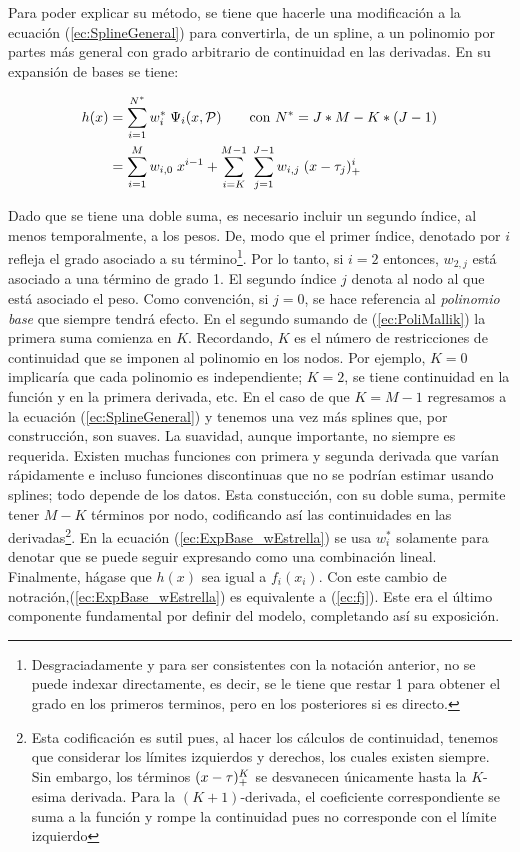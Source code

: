 \documentclass[../Main/Main.tex]{subfiles}
\begin{document}
Para poder explicar su método, se tiene que hacerle una modificación a la ecuación (\ref{ec:SplineGeneral}) para convertirla, de un spline, a un polinomio por partes más general con grado arbitrario de continuidad en las derivadas. En su expansión de bases se tiene:

\begin{align}
	h(x) &= \sum_{i = 1}^{N^*} w_i^* \; \Psi_i(x,\mathcal{P}) \qquad \text{con  } N^* = J*M - K*(J-1) \label{ec:ExpBase_wEstrella} \\ 
 		 &=	\sum_{i = 1}^M w_{i,0} \; x^{i-1} + 
			\sum_{i = K}^{M-1} \;
	 		\sum_{j = 1}^{J-1}w_{i,j}\;(x - \tau_j)_+^{i}
	 			\label{ec:PoliMallik}
\end{align}

Dado que se tiene una doble suma, es necesario incluir un segundo índice, al menos temporalmente, a los pesos. De, modo que el primer índice, denotado por $i$ refleja el grado asociado a su término\footnote{Desgraciadamente y para ser consistentes con la notación anterior, no se puede indexar directamente, es decir, se le tiene que restar 1 para obtener el grado en los primeros terminos, pero en los posteriores si es directo.}. Por lo tanto, si $i = 2$ entonces, $w_{2,j}$ está asociado a una término de grado 1. El segundo índice $j$ denota al nodo al que está asociado el peso. Como convención, si $j = 0$, se hace referencia al \textit{polinomio base} que siempre tendrá efecto. En el segundo sumando de (\ref{ec:PoliMallik}) la primera suma comienza en $K$. Recordando, $K$ es el número de restricciones de continuidad que se imponen al polinomio en los nodos. Por ejemplo, $K = 0$ implicaría que cada polinomio es independiente; $K = 2$, se tiene continuidad en la función y en la primera derivada, etc. En el caso de que $K = M-1$ regresamos a la ecuación (\ref{ec:SplineGeneral}) y tenemos una vez más splines que, por construcción, son suaves. La suavidad, aunque importante, no siempre es requerida. Existen muchas funciones con primera y segunda derivada que varían rápidamente e incluso funciones discontinuas que no se podrían estimar usando splines; todo depende de los datos. Esta constucción, con su doble suma, permite tener $M-K$ términos por nodo, codificando así las continuidades en las derivadas\footnote{Esta codificación es sutil pues, al hacer los cálculos de continuidad, tenemos que considerar los límites izquierdos y derechos, los cuales existen siempre. Sin embargo, los términos $(x-\tau)^K_+$ se desvanecen únicamente hasta la $K$-esima derivada. Para la $(K+1)$-derivada, el coeficiente correspondiente se suma a la función y rompe la continuidad pues no corresponde con el límite izquierdo}. En la ecuación (\ref{ec:ExpBase_wEstrella}) se usa $w_i^*$ solamente para denotar que se puede seguir expresando como una combinación lineal. Finalmente, hágase que $h(x)$ sea igual a $f_i(x_i)$. Con este cambio de notración,(\ref{ec:ExpBase_wEstrella}) es equivalente a (\ref{ec:fj}). Este era el último componente fundamental por definir del modelo, completando así su exposición.\\
\end{document}
